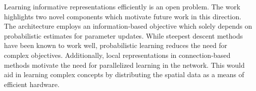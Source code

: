 \documentclass[11pt,letterpaper]{article}
\begin{document}
Learning informative representations efficiently is an open problem. The work highlights two novel components which motivate future work in this direction. The architecture employs an information-based objective which solely depends on probabilistic estimates for parameter updates. While steepest descent methods have been known to work well, probabilistic learning reduces the need for complex objectives. Additionally, local representations in connection-based methods motivate the need for parallelized learning in the network. This would aid in learning complex concepts by distributing the spatial data as a means of efficient hardware. 
\end{document}
